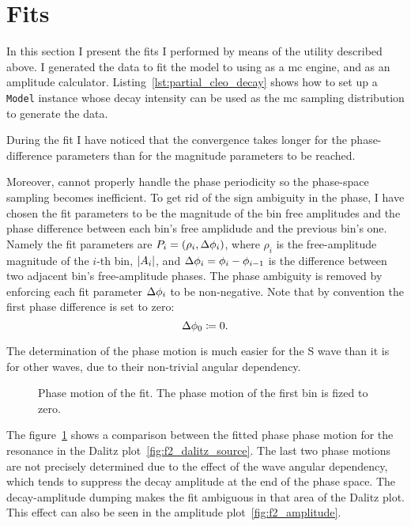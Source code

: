     
    
    

    \section{Fits}

    In this section I present the fits I performed by means of the utility described above.
    I generated the data to fit the model to using  as a \ac{mc} engine, and  as an amplitude calculator.
    Listing~\ref{lst:partial_cleo_decay} shows how to set up a \lstinline!Model! instance whose decay intensity can be used as the \ac{mc} sampling distribution to generate the data.


    During the fit I have noticed that the convergence takes longer for the phase-difference parameters than for the magnitude parameters to be reached.

    {\color{red}
    Moreover,  cannot properly handle the phase periodicity so the phase-space sampling becomes inefficient.
    To get rid of the sign ambiguity in the phase, I have chosen the fit parameters to be the magnitude of the bin free amplitudes and the phase difference between each bin's free amplidude and the previous bin's one.
    Namely the fit parameters are $P_i = (\rho_i, \mathop{}\!\textup{$\Delta$}\phi_i)$, where $\rho_i$ is the free-amplitude magnitude of the $i$-th bin, $\lvert A_i\rvert$, and $\mathop{}\!\textup{$\Delta$}\phi_i = \phi_i - \phi_{i-1}$ is the difference between two adjacent bin's free-amplitude phases. 
    The phase ambiguity is removed by enforcing each fit parameter $\mathop{}\!\textup{$\Delta$}\phi_i$ to be non-negative.
    Note that by convention the first phase difference is set to zero:
    \begin{equation}\label{eq:delta_phi_zero_cond}
        \mathop{}\!\textup{$\Delta$}\phi_0 \coloneqq 0.
    \end{equation}
    }


    
    
    


    The determination of the phase motion is much easier for the S wave than it is for other waves, due to their non-trivial angular dependency.
    \begin{figure}
        \centering
        
        \caption{Phase motion of the \Pfii{} fit. The phase motion of the first bin is fized to zero.}
        \label{fig:fit_f2_phase_motion}
    \end{figure}
    The figure~\ref{fig:fit_f2_phase_motion} shows a comparison between the fitted phase phase motion for the \Pfii{} resonance in the Dalitz plot~\ref{fig:f2_dalitz_source}. 
    The last two phase motions are not precisely determined due to the effect of the wave angular dependency, which tends to suppress the decay amplitude at the end of the phase space. 
    The decay-amplitude dumping makes the fit ambiguous in that area of the Dalitz plot.
    This effect can also be seen in the amplitude plot~\ref{fig:f2_amplitude}.


